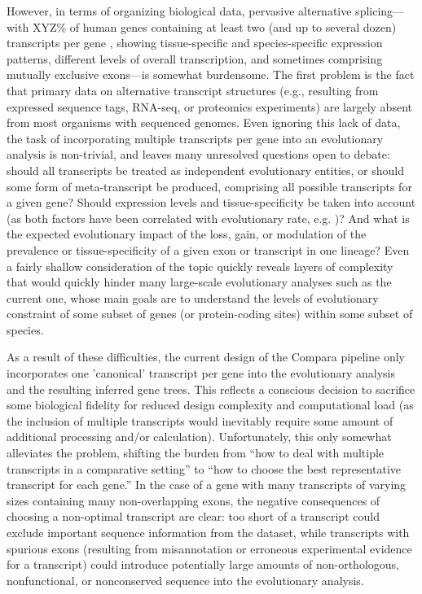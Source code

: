 However, in terms of organizing biological data, pervasive alternative
splicing---with XYZ\% of human genes containing at least two (and up
to several dozen) transcripts per gene \citep{TODO}, showing tissue-specific and
species-specific expression patterns, different levels of overall
transcription, and sometimes comprising mutually exclusive exons---is
somewhat burdensome. The first problem is the fact that primary data
on alternative transcript structures (e.g., resulting from expressed
sequence tags, RNA-seq, or proteomics experiments) are largely absent
from most organisms with sequenced genomes. Even ignoring this lack of
data, the task of incorporating multiple transcripts per gene into an
evolutionary analysis is non-trivial, and leaves many unresolved
questions open to debate: should all transcripts be treated as
independent evolutionary entities, or should some form of
meta-transcript be produced, comprising all possible transcripts for a
given gene? Should expression levels and tissue-specificity be taken
into account (as both factors have been correlated with evolutionary
rate, e.g. \citep{TODO, TODO})? And what is the expected evolutionary
impact of the loss, gain, or modulation of the prevalence or
tissue-specificity of a given exon or transcript in one lineage? Even
a fairly shallow consideration of the topic quickly reveals layers of
complexity that would quickly hinder many large-scale evolutionary
analyses such as the current one, whose main goals are to understand
the levels of evolutionary constraint of some subset of genes (or
protein-coding sites) within some subset of species.

As a result of these difficulties, the current design of the Compara
pipeline only incorporates one 'canonical' transcript per gene into
the evolutionary analysis and the resulting inferred gene trees. This
reflects a conscious decision to sacrifice some biological fidelity
for reduced design complexity and computational load (as the inclusion
of multiple transcripts would inevitably require some amount of
additional processing and/or calculation). Unfortunately, this only
somewhat alleviates the problem, shifting the burden from ``how to
deal with multiple transcripts in a comparative setting'' to ``how to
choose the best representative transcript for each gene.'' In the case
of a gene with many transcripts of varying sizes containing many
non-overlapping exons, the negative consequences of choosing a
non-optimal transcript are clear: too short of a transcript could
exclude important sequence information from the dataset, while
transcripts with spurious exons (resulting from misannotation or
erroneous experimental evidence for a transcript) could introduce
potentially large amounts of non-orthologous, nonfunctional, or
nonconserved sequence into the evolutionary analysis.

